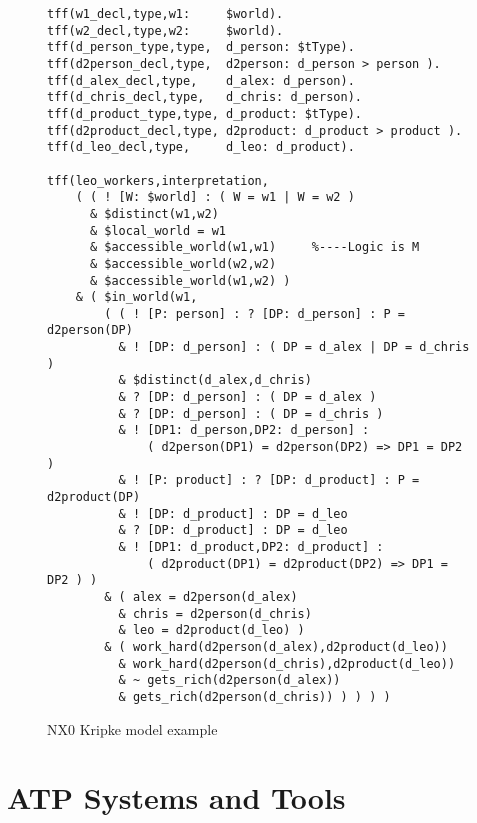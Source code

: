\documentclass[runningheads]{llncs}
\begin{document}
\begin{figure}[h!]
\small
{}
% 
\begin{verbatim}
tff(w1_decl,type,w1:     $world).
tff(w2_decl,type,w2:     $world).
tff(d_person_type,type,  d_person: $tType).
tff(d2person_decl,type,  d2person: d_person > person ).
tff(d_alex_decl,type,    d_alex: d_person).
tff(d_chris_decl,type,   d_chris: d_person).
tff(d_product_type,type, d_product: $tType).
tff(d2product_decl,type, d2product: d_product > product ).
tff(d_leo_decl,type,     d_leo: d_product).

tff(leo_workers,interpretation,
    ( ( ! [W: $world] : ( W = w1 | W = w2 )
      & $distinct(w1,w2)
      & $local_world = w1
      & $accessible_world(w1,w1)     %----Logic is M
      & $accessible_world(w2,w2)
      & $accessible_world(w1,w2) )
    & ( $in_world(w1,
        ( ( ! [P: person] : ? [DP: d_person] : P = d2person(DP)
          & ! [DP: d_person] : ( DP = d_alex | DP = d_chris )
          & $distinct(d_alex,d_chris)
          & ? [DP: d_person] : ( DP = d_alex )
          & ? [DP: d_person] : ( DP = d_chris )
          & ! [DP1: d_person,DP2: d_person] : 
              ( d2person(DP1) = d2person(DP2) => DP1 = DP2 )
          & ! [P: product] : ? [DP: d_product] : P = d2product(DP)
          & ! [DP: d_product] : DP = d_leo
          & ? [DP: d_product] : DP = d_leo
          & ! [DP1: d_product,DP2: d_product] :
              ( d2product(DP1) = d2product(DP2) => DP1 = DP2 ) )
        & ( alex = d2person(d_alex)
          & chris = d2person(d_chris)
          & leo = d2product(d_leo) )
        & ( work_hard(d2person(d_alex),d2product(d_leo))
          & work_hard(d2person(d_chris),d2product(d_leo))
          & ~ gets_rich(d2person(d_alex))
          & gets_rich(d2person(d_chris)) ) ) ) )
\end{verbatim}
\caption{NX0 Kripke model example}
\label{NX0Kripke}
\end{figure}

\section{ATP Systems and Tools}
\label{SystemsTools}
\end{document}
